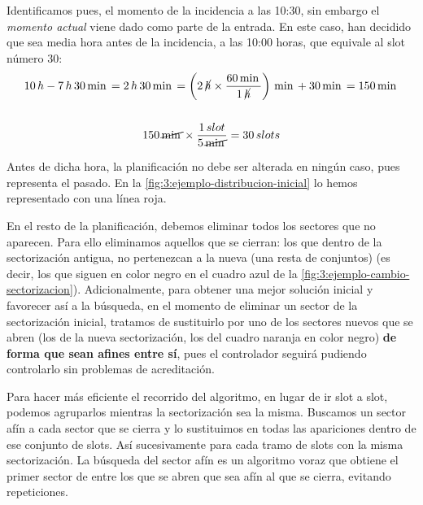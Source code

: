 Identificamos pues, el momento de la incidencia a las 10:30, sin embargo el \textit{momento actual} viene dado como parte de la entrada. En este caso, han decidido que sea media hora antes de la incidencia, a las 10:00 horas, que equivale al slot número 30:
\begin{gather*}
    10 \,h-7 \,h \,30 \,\min = 2 \,h \,30 \,\min = \left(2 \, \cancel{h} \times \frac{60 \,\min}{1 \,\cancel{h}}\right)
	\,\min + 30\,\min = 150
	\,\min\\\\
    150 \,\cancel{\min} \times \frac{1\,slot}{5\,\cancel{\min}} = 30\,slots\\
\end{gather*}

Antes de dicha hora, la planificación no debe ser alterada en ningún caso, pues representa el pasado. En la 
\autoref{fig:3:ejemplo-distribucion-inicial} lo hemos representado con una línea roja. 

En el resto de la planificación, debemos eliminar todos los sectores que no aparecen. Para ello eliminamos aquellos que se cierran: los que dentro de la sectorización antigua, no pertenezcan a la nueva (una resta de conjuntos) (es decir, los que siguen en color negro en el cuadro azul de la \autoref{fig:3:ejemplo-cambio-sectorizacion}). 
Adicionalmente, para obtener una mejor solución inicial y favorecer así a la búsqueda, en el momento de eliminar un sector de la sectorización inicial, tratamos de sustituirlo por uno de los sectores nuevos que se abren (los de la nueva sectorización, los del cuadro naranja en color negro) \textbf{de forma que sean afines entre sí}, pues el controlador seguirá pudiendo controlarlo sin problemas de acreditación. %

Para hacer más eficiente el recorrido del algoritmo, en lugar de ir slot a slot, podemos agruparlos mientras la sectorización sea la misma. Buscamos un sector afín a cada sector que se cierra y lo sustituimos en todas las apariciones dentro de ese conjunto de slots. Así sucesivamente para cada tramo de slots con la misma sectorización. 
La búsqueda del sector afín es un algoritmo voraz que obtiene el primer sector de entre los que se abren que sea afín al que se cierra, evitando repeticiones.

